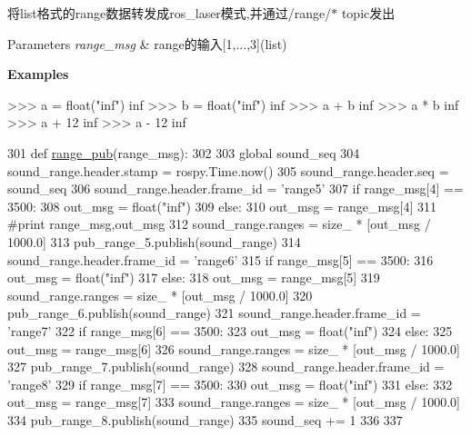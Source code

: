 将list格式的range数据转发成ros\+\_\+laser模式,并通过/range/$\ast$ topic发出


\begin{DoxyParams}{Parameters}
{\em range\+\_\+msg} & range的输入\mbox{[}1,...,3\mbox{]}(list)\\
\hline
\end{DoxyParams}
{\bfseries Examples} 
\begin{DoxyCode}
>>> a = float(\textcolor{stringliteral}{"inf"})
inf
>>> b = float(\textcolor{stringliteral}{"inf"})
inf
>>> a + b
inf
>>> a * b
inf
>>> a + 12
inf
>>> a - 12
inf
\end{DoxyCode}
 
\begin{DoxyCode}
301 \textcolor{keyword}{def }\hyperlink{namespaceserial__af__dox_a8431825ba6486f7d2e0ddfda61a4ae5d}{range\_pub}(range\_msg):
302 
303     \textcolor{keyword}{global} sound\_seq
304     sound\_range.header.stamp = rospy.Time.now()
305     sound\_range.header.seq = sound\_seq
306     sound\_range.header.frame\_id = \textcolor{stringliteral}{'range5'}
307     \textcolor{keywordflow}{if} range\_msg[4] == 3500:
308         out\_msg = float(\textcolor{stringliteral}{"inf"})
309     \textcolor{keywordflow}{else}:
310         out\_msg = range\_msg[4]
311     \textcolor{comment}{#print range\_msg,out\_msg}
312     sound\_range.ranges = size\_ * [out\_msg / 1000.0]
313     pub\_range\_5.publish(sound\_range)
314     sound\_range.header.frame\_id = \textcolor{stringliteral}{'range6'}
315     \textcolor{keywordflow}{if} range\_msg[5] == 3500:
316         out\_msg = float(\textcolor{stringliteral}{"inf"})
317     \textcolor{keywordflow}{else}:
318         out\_msg = range\_msg[5]
319     sound\_range.ranges = size\_ * [out\_msg / 1000.0]
320     pub\_range\_6.publish(sound\_range)
321     sound\_range.header.frame\_id = \textcolor{stringliteral}{'range7'}
322     \textcolor{keywordflow}{if} range\_msg[6] == 3500:
323         out\_msg = float(\textcolor{stringliteral}{"inf"})
324     \textcolor{keywordflow}{else}:
325         out\_msg = range\_msg[6]
326     sound\_range.ranges = size\_ * [out\_msg / 1000.0]
327     pub\_range\_7.publish(sound\_range)
328     sound\_range.header.frame\_id = \textcolor{stringliteral}{'range8'}
329     \textcolor{keywordflow}{if} range\_msg[7] == 3500:
330         out\_msg = float(\textcolor{stringliteral}{"inf"})
331     \textcolor{keywordflow}{else}:
332         out\_msg = range\_msg[7]
333     sound\_range.ranges = size\_ * [out\_msg / 1000.0]
334     pub\_range\_8.publish(sound\_range)
335     sound\_seq += 1
336 
337 
\end{DoxyCode}
\mbox{\label{namespaceserial__af__dox_a88369fbec8f4073e79e32dc236e5e282}} 
